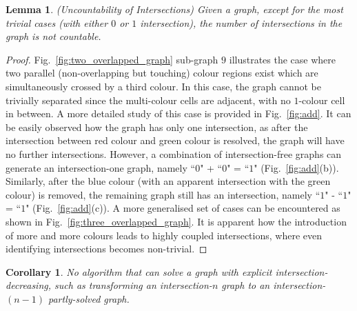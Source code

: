 \documentclass[journal]{IEEEtran}
\newtheorem{lemma}[theorem]{Lemma}
\newtheorem{corollary}[theorem]{Corollary}
\begin{document}
\begin{lemma}
(Uncountability of Intersections) Given a graph, except for the most trivial cases (with either $0$ or $1$ intersection), the number of intersections in the graph is not countable. 
\end{lemma}
\begin{proof}
Fig.~\ref{fig:two_overlapped_graph} sub-graph $9$ illustrates the case where two parallel (non-overlapping but touching) colour regions exist which are simultaneously crossed by a third colour. In this case, the graph cannot be trivially separated since the multi-colour cells are adjacent, with no $1$-colour cell in between. 
A more detailed study of this case is provided in  Fig.~\ref{fig:add}. It can be easily observed how the graph has only one intersection, as after the intersection between red colour and green colour is resolved, the graph will have no further intersections. %
However, a combination of intersection-free graphs can generate an intersection-one graph, namely ``$0$" + ``$0$" = ``$1$" (Fig.~\ref{fig:add}(b)). %
Similarly, after the blue colour (with an apparent intersection with the green colour) is removed, %
the remaining graph still has an intersection, namely ``$1$" - ``$1$" = ``$1$" (Fig.~\ref{fig:add}(c)). 
A more generalised set of cases can be encountered as shown in Fig.~\ref{fig:three_overlapped_graph}. It is apparent how the introduction of more and more colours leads to highly coupled intersections, where even identifying intersections becomes non-trivial. 
\end{proof}




\begin{corollary}
No algorithm that can solve a graph with explicit intersection-decreasing, such as transforming an intersection-$n$ graph to an intersection-$(n-1)$ partly-solved graph.
\end{corollary}
\end{document}
